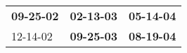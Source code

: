 \begin{supertabular}{p{0.33\columnwidth}p{0.33\columnwidth}p{0.33\columnwidth}}
 \textbf{09-25-02\textsuperscript{}} &  \textbf{02-13-03\textsuperscript{}} &  \textbf{05-14-04\textsuperscript{}} \\
          12-14-02\textsuperscript{} &  \textbf{09-25-03\textsuperscript{}} &  \textbf{08-19-04\textsuperscript{}} \\
\end{supertabular}
